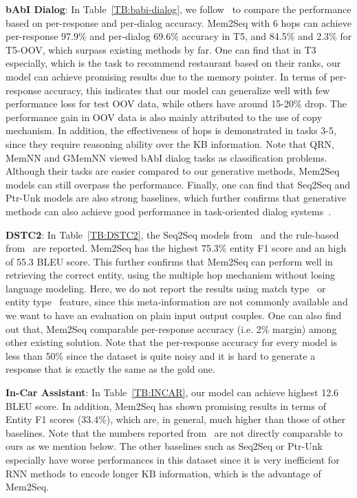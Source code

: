 \documentclass[11pt,a4paper]{article}
\begin{document}
\noindent\textbf{bAbI Dialog}: 
In Table~\ref{TB:babi-dialog}, we follow~\citet{bordes2016learning} to compare the performance based on per-response and per-dialog accuracy. Mem2Seq with 6 hops can achieve per-response 97.9\% and per-dialog 69.6\% accuracy in T5, and 84.5\% and 2.3\% for T5-OOV, which surpass existing methods by far. One can find that in T3 especially, which is the task to recommend restaurant based on their ranks, our model can achieve promising results due to the memory pointer. In terms of per-response accuracy, this indicates that our model can generalize well with few performance loss for test OOV data, while others have around 15-20\% drop. The performance gain in OOV data is also mainly attributed to the use of copy mechanism. In addition, the effectiveness of hops is demonstrated in tasks 3-5, since they require reasoning ability over the KB information. 
Note that QRN, MemNN and GMemNN viewed bAbI dialog tasks as classification problems. Although their tasks are easier compared to our generative methods, Mem2Seq models can still overpass the performance.
Finally, one can find that Seq2Seq and Ptr-Unk models are also strong baselines, which further confirms that generative methods can also achieve good performance in task-oriented dialog systems~\cite{eric-manning:2017:EACLshort}.    

\noindent\textbf{DSTC2}: 
In Table~\ref{TB:DSTC2}, the Seq2Seq models from~\citet{eric-manning:2017:EACLshort} and the rule-based from~\citet{bordes2016learning} are reported. Mem2Seq has the highest 75.3\% entity F1 score and an high of 55.3 BLEU score. This further confirms that Mem2Seq can perform well in retrieving the correct entity, using the multiple hop mechanism without losing language modeling. Here, we do not report the results using match type~\cite{bordes2016learning} or entity type~\cite{eric-manning:2017:EACLshort} feature, since this meta-information are not commonly available and we want to have an evaluation on plain input output couples. One can also find out that, Mem2Seq comparable per-response accuracy (i.e. 2\% margin) among other existing solution. Note that the per-response accuracy for every model is less than 50\% since the dataset is quite noisy and it is hard to generate a response that is exactly the same as the gold one. 

\noindent\textbf{In-Car Assistant}: 
In Table~\ref{TB:INCAR}, our model can achieve highest 12.6 BLEU score. In addition, Mem2Seq has shown promising results in terms of Entity F1 scores (33.4\%), which are, in general, much higher than those of other baselines. Note that the numbers reported from~\citet{ericKVR2017} are not directly comparable to ours as we mention below. The other baselines such as Seq2Seq or Ptr-Unk especially have worse performances in this dataset since it is very inefficient for RNN methods to encode longer KB information, which is the advantage of Mem2Seq.
\end{document}
